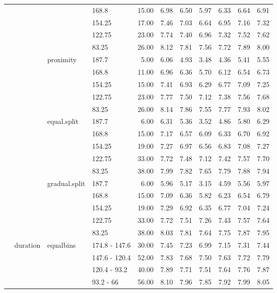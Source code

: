 \begin{longtable}{llllrrrrrrr}
   &  &  & 168.8 & 15.00 & 6.98 & 6.50 & 5.97 & 6.33 & 6.64 & 6.91 \\ 
   &  &  & 154.25 & 17.00 & 7.46 & 7.03 & 6.64 & 6.95 & 7.16 & 7.32 \\ 
   &  &  & 122.75 & 23.00 & 7.74 & 7.40 & 6.96 & 7.32 & 7.52 & 7.62 \\ 
   &  &  & 83.25 & 26.00 & 8.12 & 7.81 & 7.56 & 7.72 & 7.89 & 8.00 \\ 
   &  & proximity & 187.7 & 5.00 & 6.06 & 4.93 & 3.48 & 4.36 & 5.41 & 5.55 \\ 
   &  &  & 168.8 & 11.00 & 6.96 & 6.36 & 5.70 & 6.12 & 6.54 & 6.73 \\ 
   &  &  & 154.25 & 15.00 & 7.41 & 6.93 & 6.29 & 6.77 & 7.09 & 7.25 \\ 
   &  &  & 122.75 & 23.00 & 7.77 & 7.50 & 7.12 & 7.38 & 7.56 & 7.68 \\ 
   &  &  & 83.25 & 26.00 & 8.14 & 7.86 & 7.55 & 7.77 & 7.93 & 8.02 \\ 
   &  & equal.split & 187.7 & 6.00 & 6.31 & 5.36 & 3.52 & 4.86 & 5.80 & 6.29 \\ 
   &  &  & 168.8 & 15.00 & 7.17 & 6.57 & 6.09 & 6.33 & 6.70 & 6.92 \\ 
   &  &  & 154.25 & 19.00 & 7.27 & 6.97 & 6.56 & 6.83 & 7.08 & 7.27 \\ 
   &  &  & 122.75 & 33.00 & 7.72 & 7.48 & 7.12 & 7.42 & 7.57 & 7.70 \\ 
   &  &  & 83.25 & 38.00 & 7.99 & 7.82 & 7.65 & 7.79 & 7.88 & 7.94 \\ 
   &  & gradual.split & 187.7 & 6.00 & 5.96 & 5.17 & 3.15 & 4.59 & 5.56 & 5.97 \\ 
   &  &  & 168.8 & 15.00 & 7.09 & 6.36 & 5.82 & 6.23 & 6.54 & 6.79 \\ 
   &  &  & 154.25 & 19.00 & 7.29 & 6.92 & 6.35 & 6.77 & 7.04 & 7.24 \\ 
   &  &  & 122.75 & 33.00 & 7.72 & 7.51 & 7.26 & 7.43 & 7.57 & 7.64 \\ 
   &  &  & 83.25 & 38.00 & 8.03 & 7.81 & 7.64 & 7.75 & 7.87 & 7.95 \\ 
   & duration & equalbins & 174.8 - 147.6 & 30.00 & 7.45 & 7.23 & 6.99 & 7.15 & 7.31 & 7.44 \\ 
   &  &  & 147.6 - 120.4 & 52.00 & 7.83 & 7.68 & 7.50 & 7.63 & 7.72 & 7.79 \\ 
   &  &  & 120.4 - 93.2 & 40.00 & 7.89 & 7.71 & 7.51 & 7.64 & 7.76 & 7.87 \\ 
   &  &  & 93.2 - 66 & 56.00 & 8.10 & 7.96 & 7.85 & 7.92 & 7.99 & 8.05 \\ 

\end{longtable}
